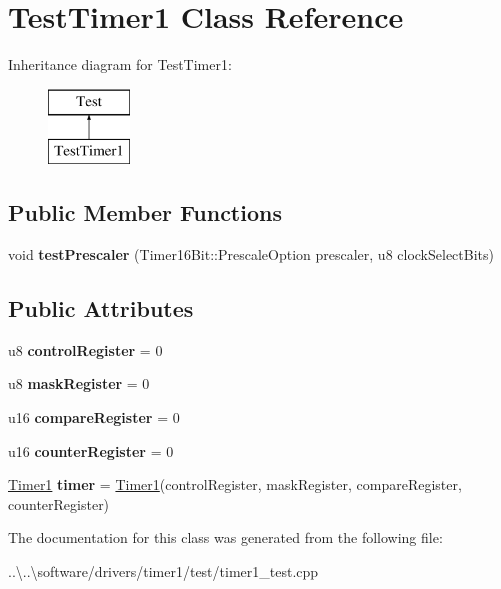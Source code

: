\hypertarget{class_test_timer1}{}\section{Test\+Timer1 Class Reference}
\label{class_test_timer1}
Inheritance diagram for Test\+Timer1\+:\begin{figure}[H]
\begin{center}
\leavevmode
\includegraphics[height=2.000000cm]{class_test_timer1}
\end{center}
\end{figure}
\subsection*{Public Member Functions}
\begin{DoxyCompactItemize}
\item 
\mbox{\label{class_test_timer1_a4d7cf69c616454c22965c8ab4c66f2db}} 
void {\bfseries test\+Prescaler} (Timer16\+Bit\+::\+Prescale\+Option prescaler, u8 clock\+Select\+Bits)
\end{DoxyCompactItemize}
\subsection*{Public Attributes}
\begin{DoxyCompactItemize}
\item 
\mbox{\label{class_test_timer1_add5d5b6530c9413c76006ecf1298a557}} 
u8 {\bfseries control\+Register} = 0
\item 
\mbox{\label{class_test_timer1_a558b30afc156a6b059dec60b0865afff}} 
u8 {\bfseries mask\+Register} = 0
\item 
\mbox{\label{class_test_timer1_a8dfc65d3d55a990516eedf2b53b45c4a}} 
u16 {\bfseries compare\+Register} = 0
\item 
\mbox{\label{class_test_timer1_a73a86e57155af36771df5355b2caea13}} 
u16 {\bfseries counter\+Register} = 0
\item 
\mbox{\label{class_test_timer1_ae95c4709c5e8061b5fe4a4c16e46860e}} 
\mbox{\hyperlink{class_timer1}{Timer1}} {\bfseries timer} = \mbox{\hyperlink{class_timer1}{Timer1}}(control\+Register, mask\+Register, compare\+Register, counter\+Register)
\end{DoxyCompactItemize}


The documentation for this class was generated from the following file\+:\begin{DoxyCompactItemize}
\item 
..\textbackslash{}..\textbackslash{}software/drivers/timer1/test/timer1\+\_\+test.\+cpp\end{DoxyCompactItemize}
